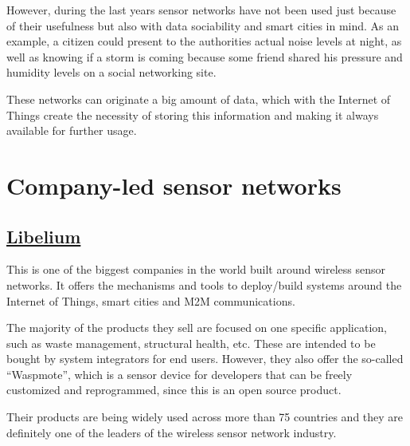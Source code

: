 However, during the last years sensor networks have not been used just because of their usefulness but also with data sociability and smart cities in mind. As an example, a citizen could present to the authorities actual noise levels at night, as well as knowing if a storm is coming because some friend shared his pressure and humidity levels on a social networking site.

These networks can originate a big amount of data, which with the Internet of Things create the necessity of storing this information and making it always available for further usage.


\section{Company-led sensor networks}

%
%

\subsection{\href{http://www.libelium.com/}{Libelium}}

This is one of the biggest companies in the world built around wireless sensor networks. It offers the mechanisms and tools to deploy/build systems around the Internet of Things, smart cities and M2M communications.

The majority of the products they sell are focused on one specific application, such as waste management, structural health, etc. These are intended to be bought by system integrators for end users. However, they also offer the so-called ``Waspmote'', which is a sensor device for developers that can be freely customized and reprogrammed, since this is an open source product.

Their products are being widely used across more than 75 countries and they are definitely one of the leaders of the wireless sensor network industry.


